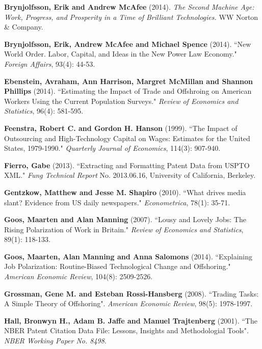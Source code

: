 \documentclass[11pt,a4paper,fleqn]{article}
\begin{document}
\begin{thebibliography}{9}
	 \textbf{Brynjolfsson, Erik and Andrew McAfee} (2014). \textit{The Second Machine Age: Work, Progress, and Prosperity in a Time of Brilliant Technologies.} WW Norton \& Company.
	
		\textbf{Brynjolfsson, Erik, Andrew McAfee and Michael Spence} (2014). ``New World Order. Labor, Capital, and Ideas in the New Power Law Economy." \textit{Foreign Affairs}, 93(4): 44-53.
	
	 \textbf{Ebenstein, Avraham, Ann Harrison, Margret McMillan and Shannon Phillips} (2014). ``Estimating the Impact of Trade and Offshroing on American Workers Using the Current Population Surveys." \textit{Review of Economics and Statistics}, 96(4): 581-595. 
	
	 \textbf{Feenstra, Robert C. and Gordon H. Hanson} (1999). ``The Impact of Outsourcing and High-Technology Capital on Wages: Estimates for the United States, 1979-1990." \textit{Quarterly Journal of Economics}, 114(3): 907-940.

	 \textbf{Fierro, Gabe} (2013). ``Extracting and Formatting Patent Data from USPTO XML." \textit{Fung Technical Report} No. 2013.06.16, University of California, Berkeley.
	
	 \textbf{Gentzkow, Matthew and Jesse M. Shapiro} (2010). ``What drives media slant? Evidence from US daily newspapers." \textit{Econometrica}, 78(1): 35-71.

	 \textbf{Goos, Maarten and Alan Manning} (2007). ``Lousy and Lovely Jobs: The Rising Polarization of Work in Britain." \textit{Review of Economics and Statistics}, 89(1): 118-133.
	
	 \textbf{Goos, Maarten, Alan Manning and Anna Salomons} (2014). ``Explaining Job Polarization: Routine-Biased Technological Change and Offshoring." \textit{American Economic Review}, 104(8): 2509-2526.
	
	 \textbf{Grossman, Gene M. and Esteban Rossi-Hansberg} (2008). ``Trading Tasks: A Simple Theory of Offshoring". \textit{American Economic Review}, 98(5): 1978-1997.

	 \textbf{Hall, Bronwyn H., Adam B. Jaffe and Manuel Trajtenberg} (2001). ``The NBER Patent Citation Data File: Lessons, Insights and Methodologial Tools". \textit{NBER Working Paper No. 8498}.
	

\end{thebibliography}
\end{document}
